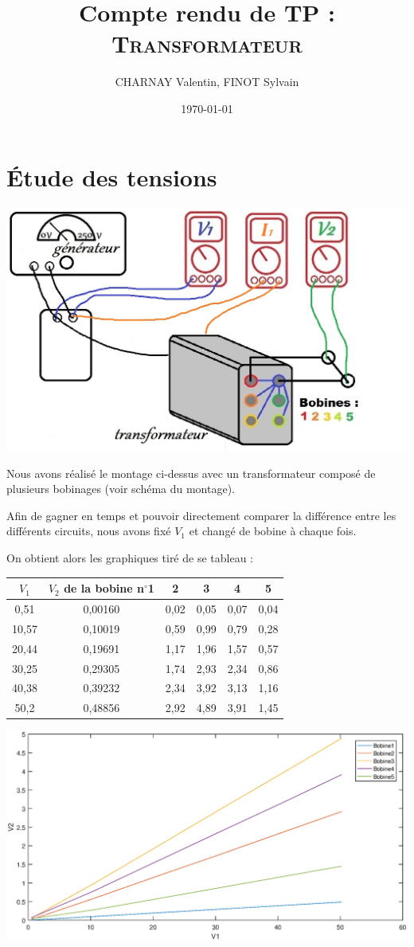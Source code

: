 \documentclass[12pt,a4paper]{article}
\author{CHARNAY Valentin, FINOT Sylvain}
\title{Compte rendu de TP :\\[4pt] \scshape Transformateur}
\date{\today}
\begin{document}
	\maketitle
	\section*{Étude des tensions}
	\begin{center}
		\includegraphics[scale=0.6]{schema2}
	\end{center}
	Nous avons réalisé le montage ci-dessus avec un transformateur composé de plusieurs bobinages (voir schéma du montage).
	
	Afin de gagner en temps et pouvoir directement comparer la différence entre les différents circuits, nous avons fixé $V_1$ et changé de bobine à chaque fois.
	
	On obtient alors les graphiques tiré de se tableau : 
	\begin{center}
		
		
		\begin{tabular}{cccccc}
			$V_1$ & $V_2$ de la bobine n$^{\circ}$1 & 2 & 3 & 4 & 5 \\
			\hline
			0,51  & 0,00160  & 0,02 & 0,05 & 0,07 & 0,04\\
			10,57 & 0,10019  & 0,59 & 0,99 & 0,79 & 0,28\\
			20,44 & 0,19691  & 1,17 & 1,96 & 1,57 & 0,57\\
			30,25 & 0,29305  & 1,74 & 2,93 & 2,34 & 0,86\\
			40,38 & 0,39232  & 2,34 & 3,92 & 3,13 & 1,16\\
			50,2  & 0,48856  & 2,92 & 4,89 & 3,91 & 1,45\\
		\end{tabular}
	\end{center}
	\includegraphics[width=\linewidth]{res/Bobines.eps}
	
\end{document}
